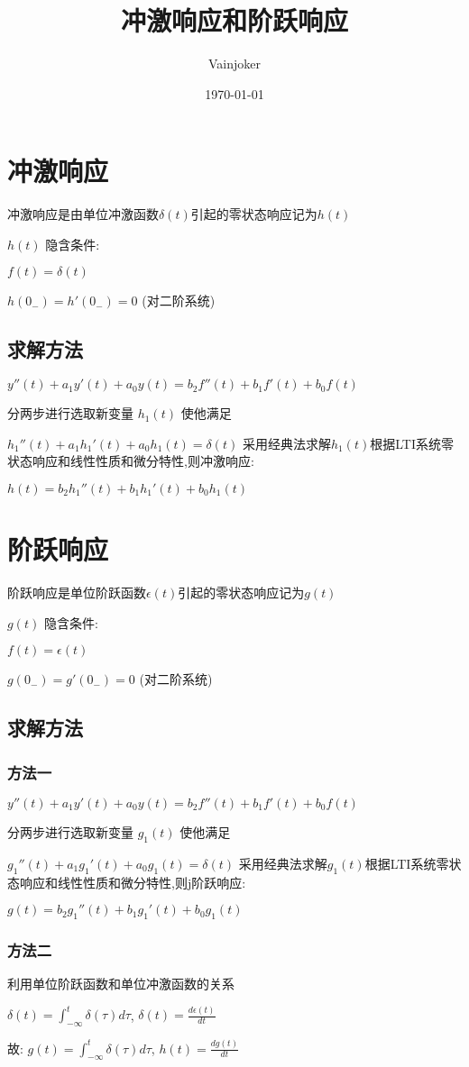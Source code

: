 \documentclass{article}
\title{冲激响应和阶跃响应}
\author{Vainjoker}
\date{\today}
\begin{document}
    \maketitle
    \newpage

    \section{冲激响应}%
    冲激响应是由单位冲激函数$\delta(t)$引起的零状态响应记为$h(t)$

    $h(t)$ 隐含条件:

    $f(t)=\delta (t)$

    $h(0_-)=h'(0_-)=0$ (对二阶系统)

    \subsection{求解方法}%
    $y''(t)+a_1y'(t)+a_0y(t)=b_2f''(t)+b_1f'(t)+b_0f(t)$

    分两步进行选取新变量 $h_1(t)$ 使他满足

    $h_1''(t)+a_1h_1'(t)+a_0h_1(t)=\delta(t)$
    采用经典法求解$h_1(t)$根据LTI系统零状态响应和线性性质和微分特性,则冲激响应:

    $h(t)=b_2h_1''(t)+b_1h_1'(t)+b_0h_1(t)$


    \section{阶跃响应}%
    阶跃响应是单位阶跃函数$\epsilon(t)$引起的零状态响应记为$g(t)$


    $g(t)$ 隐含条件:

    $f(t)=\epsilon (t)$

    $g(0_-)=g'(0_-)=0$ (对二阶系统)

    \subsection{求解方法}%

    \subsubsection{方法一}%
    
    $y''(t)+a_1y'(t)+a_0y(t)=b_2f''(t)+b_1f'(t)+b_0f(t)$
    
    分两步进行选取新变量 $g_1(t)$ 使他满足

    $g_1''(t)+a_1g_1'(t)+a_0g_1(t)=\delta(t)$
    采用经典法求解$g_1(t)$根据LTI系统零状态响应和线性性质和微分特性,则j阶跃响应:

    $g(t)=b_2g_1''(t)+b_1g_1'(t)+b_0g_1(t)$

    \subsubsection{方法二}%
    利用单位阶跃函数和单位冲激函数的关系

    $\delta(t)=\int^{t}_{-\infty}\delta(\tau)d\tau$,
    $\delta(t)=\frac{d\epsilon(t)}{dt}$

    故:
    $g(t)= \int_{-\infty}^t\delta(\tau)d\tau$,
    $h(t)=\frac{dg(t)}{dt}$
\end{document}
